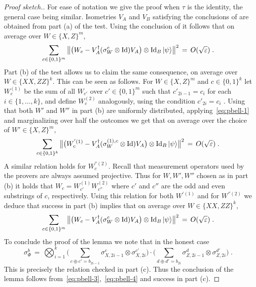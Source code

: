 \documentclass{toc}
\newcommand{\ket}[1]{|#1\rangle}
\newcommand{\Id}{\ensuremath{\mathop{\rm Id}\nolimits}}
\newcommand{\eps}{\varepsilon}
\begin{document}
\begin{proof}[Proof sketch.]
For ease of notation we give the proof when $\tau$ is the identity, the general case being similar. 
Isometries $V_A$ and $V_B$ satisfying the conclusions of 
 are obtained from part (a) of the test. Using the conclusion of  it follows that on average over $W\in\{X,Z\}^m$, 
\begin{equation}\label{eq:pbell-1}
 \sum_{c\in\{0,1\}^m} \big\| \big(W_c -V_A^\dagger (\sigma_W^c \otimes \Id) V_A\big) \otimes \Id_B \ket{\psi} \big\|^2 \,=\, O(\sqrt{\eps})\;.
\end{equation}
Part (b) of the test allows us to claim the same consequence, on average over $W\in\{XX,ZZ\}^k$. This can be seen as follows. For $W\in\{X,Z\}^m$ and $c\in\{0,1\}^k$ let $W^{(1)}_c$ be the sum of all $W_{c'}$ over $c'\in\{0,1\}^m$ such that $c'_{2i-1}=c_i$ for each $i\in \{1,\ldots,k\}$, and define $W^{(2)}_c$ analogously, using the condition $c'_{2i}=c_i$ . Using that both $W'$ and $W''$ in part (b) are uniformly distributed, applying~\eqref{eq:pbell-1} and marginalizing over half the outcomes we get that on average over the choice of $W'\in\{X,Z\}^m $,
\begin{equation}\label{eq:pbell-2}
 \sum_{c\in\{0,1\}^k} \big\| \big(W^{'(1)}_c -V_A^\dagger (\sigma_W^{(1),c} \otimes \Id) V_A\big) \otimes \Id_B \ket{\psi} \big\|^2 \,=\, O(\sqrt{\eps})\;.
\end{equation}
A similar relation holds for $W^{''(2)}_c$. Recall that measurement operators used by the provers are always assumed projective. Thus for $W,W',W''$ chosen as in part (b) it holds that $W_c = W^{(1)}_{c'} W^{(2)}_{c''}$ where $c'$ and $c''$ are the odd and even substrings of $c$, respectively.
Using this relation  for both $W^{'(1)}$ and for $W^{''(2)}$ we deduce that success in part (b) implies that on average over $W\in\{XX,ZZ\}^k$,
\begin{equation}\label{eq:pbell-3}
 \sum_{c\in\{0,1\}^m} \big\| \big(W_c -V_A^\dagger (\sigma_W^{c }\otimes \Id) V_A\big) \otimes \Id_B \ket{\psi} \big\|^2 \,=\, O(\sqrt{\eps})\;.
\end{equation}
To conclude the proof of the lemma we note that in the honest case
\begin{equation}\label{eq:pbell-4}
 \sigma_{\Phi}^b \,=\, \bigotimes_{i=1}^k \Big( \sum_{c\oplus c' = b_{2i-1}} \sigma_{X,2i-1}^{c}\otimes \sigma_{X,2i}^{c'}\Big)\cdot\Big(\sum_{d\oplus d' = b_{2i} }\sigma_{Z,2i-1}^{d}\otimes \sigma_{Z,2i}^{d'}\Big)\;.
\end{equation}
This is precisely the relation checked in part (c). Thus the conclusion of the lemma follows from~\eqref{eq:pbell-3},~\eqref{eq:pbell-4} and success in part (c).  
\end{proof}
\end{document}
